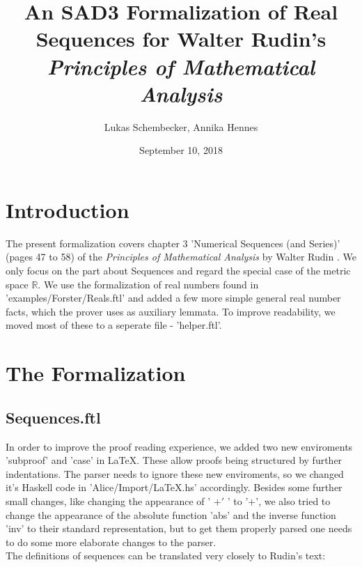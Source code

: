 \documentclass{article}
\begin{document}
\title{An SAD3 Formalization of Real Sequences for Walter Rudin's
\it{Principles of Mathematical Analysis}}

\author{Lukas Schembecker, Annika Hennes}

\date{September 10, 2018}

\maketitle


\section{Introduction}
The present formalization covers chapter 3 'Numerical Sequences (and Series)' (pages 47 to 58) of the {\it Principles of Mathematical Analysis} by Walter \linebreak Rudin \cite{Rudin}. We only focus on the part about Sequences and regard the special case of the metric space $\mathbb{R}$. We use the formalization of real numbers found in 'examples/Forster/Reals.ftl' and added a few more simple general real number facts, which the prover uses as auxiliary lemmata. To improve readability, we moved most of these to a seperate file - 'helper.ftl'.

\section{The Formalization}
\subsection{Sequences.ftl}

In order to improve the proof reading experience, we added two new enviroments 'subproof' and 'case' in LaTeX. These allow proofs being structured by further indentations. The parser needs to ignore these new enviroments, so we changed it's Haskell code in 'Alice/Import/LaTeX.hs' accordingly. Besides some further small changes, like changing the appearance of ' $+'$ ' to '$+$', we also tried to change the appearance of the absolute function 'abs' and the inverse function 'inv' to their standard representation, but to get them properly parsed one needs to do some more elaborate changes to the parser.\\

\noindent The definitions of sequences can be translated very closely to Rudin's text:
\end{document}
